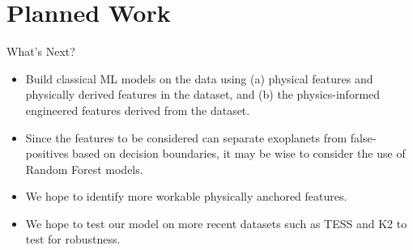 \documentclass[9pt, aspectratio=169]{beamer}
\begin{document}
\section{Planned Work}

\begin{frame}{What's Next?}
    \begin{itemize}
        \item Build classical ML models on the data using (a) physical features and physically derived features in the dataset, and (b) the physics-informed engineered features derived from the dataset.
        \item Since the features to be considered can separate exoplanets from false-positives based on decision boundaries, it may be wise to consider the use of Random Forest models.
        \item We hope to identify more workable physically anchored features.
        \item We hope to test our model on more recent datasets such as TESS and K2 to test for robustness.
    \end{itemize}
\end{frame}
\end{document}
